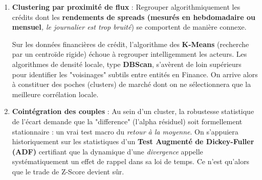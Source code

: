 \begin{enumerate}
    \item \textbf{Clustering par proximité de flux} : Regrouper algorithmiquement les crédits dont les \textbf{rendements de spreads (mesurés en hebdomadaire ou mensuel}\textit{, le journalier est trop bruité}) se comportent de manière connexe.
    \begin{remarque}
    Sur les données financières de crédit, l'algorithme des \textbf{K-Means} (recherche par un centroïde rigide) échoue à regrouper intelligemment les acteurs. Les algorithmes de densité locale, type \textbf{DBScan}, s'avèrent de loin supérieurs pour identifier les "voisinages" subtils entre entités en Finance. On arrive alors à constituer des poches (clusters) de marché dont on ne sélectionnera que la meilleure corrélation locale.
    \end{remarque}
    
    \item \textbf{Cointégration des couples} : Au sein d'un cluster, la robustesse statistique de l'écart demande que la "difference" (l'alpha résiduel) soit formellement stationnaire : un vrai test macro du \textit{retour à la moyenne}. On s'appuiera historiquement sur les statistiques d'un \textbf{Test Augmenté de Dickey-Fuller (ADF)} certifiant que la dynamique d'une \textit{divergence} appelle systématiquement un effet de rappel dans sa loi de temps. Ce n'est qu'alors que le trade de Z-Score devient sûr.
\end{enumerate}

